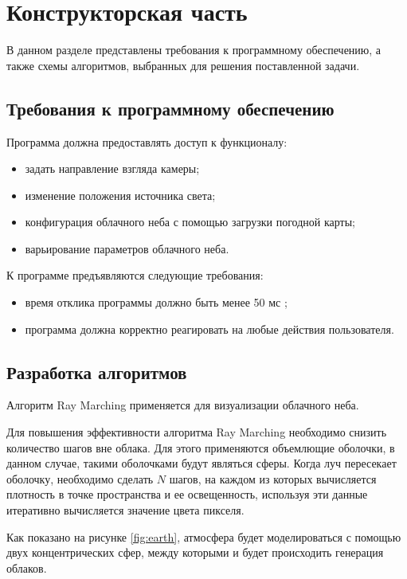 \chapter{Конструкторская часть}

В данном разделе представлены требования к программному обеспечению, а также схемы алгоритмов, выбранных для решения поставленной
задачи.

\section{Требования к программному обеспечению}
Программа должна предоставлять доступ к функционалу:
\begin{itemize}
	\item задать направление взгляда камеры;
	\item изменение положения источника света;
	\item конфигурация облачного неба с помощью загрузки погодной карты;
	\item варьирование параметров облачного неба.
\end{itemize}

К программе предъявляются следующие требования:
\begin{itemize}
	\item время отклика программы должно быть менее 50 мс \cite{hzd};
	\item программа должна корректно реагировать на любые действия пользователя.
\end{itemize}

\section{Разработка алгоритмов}

Алгоритм Ray Marching применяется для визуализации облачного неба. 

Для повышения эффективности алгоритма Ray Marching необходимо снизить количество шагов вне облака. Для этого применяются объемлющие оболочки, в данном случае, такими оболочками будут являться сферы. Когда луч пересекает оболочку, необходимо сделать $ N $ шагов, на каждом из которых вычисляется плотность в точке пространства и ее освещенность, используя эти данные итеративно вычисляется значение цвета пикселя. 

Как показано на рисунке \ref{fig:earth}, атмосфера будет моделироваться с помощью двух концентрических сфер, между которыми и будет происходить генерация облаков.

